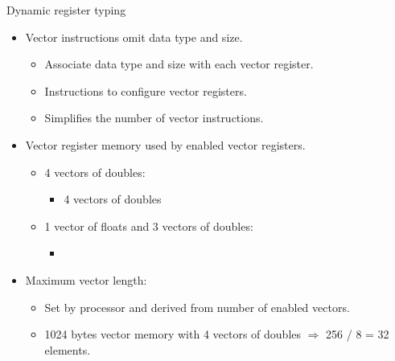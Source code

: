 \begin{frame}[t]{Dynamic register typing}
\begin{itemize}
  \item Vector instructions omit data type and size.
    \begin{itemize}
      \item Associate data type and size with each vector register.
      \item Instructions to configure vector registers.
      \item Simplifies the number of vector instructions.
    \end{itemize}

  \item Vector register memory used by enabled vector registers.
    \begin{itemize}
      \item 4 vectors of doubles:
        \begin{itemize}
          \item {}  4 vectors of doubles
        \end{itemize}
      \item 1 vector of floats and 3 vectors of doubles:
        \begin{itemize}
          \item {} 
        \end{itemize}
    \end{itemize}

  \item Maximum vector length:
    \begin{itemize}
      \item Set by processor and derived from number of enabled vectors.
      \item 1024 bytes vector memory with 4 vectors of doubles $\Rightarrow$ 256 / 8 = 32 elements.
    \end{itemize}
\end{itemize}
\end{frame}

